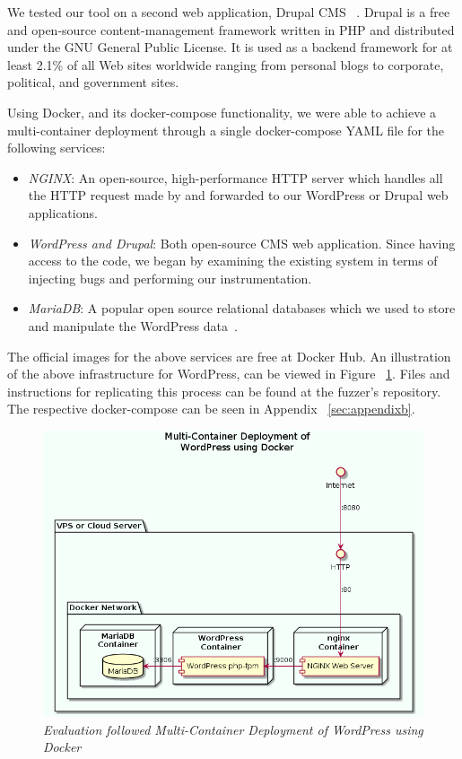 We tested our tool on a second web application, Drupal CMS ~\cite{drupal}. Drupal is a free and open-source content-management framework written in PHP and distributed under the GNU General Public License. It is used as a backend framework for at least 2.1\% of all Web sites worldwide ranging from personal blogs to corporate, political, and government sites.

Using Docker, and its docker-compose functionality, we were able to achieve a multi-container deployment through a single docker-compose YAML file for the following services:

\begin{itemize}
	\item \emph{NGINX}: An open-source, high-performance HTTP server which handles all the HTTP request made by \pname{} and forwarded to our WordPress or Drupal web applications.{~\cite{nginx}}
	\item \emph{WordPress and Drupal}: Both open-source CMS web application. Since having access to the code, we began by examining the existing system in terms of injecting bugs and performing our instrumentation.
	\item \emph{MariaDB}: A popular open source relational databases which we used to store and manipulate the WordPress data~\cite{mariadb}.
\end{itemize}

The official images for the above services are free at Docker Hub. An illustration of the above infrastructure for WordPress, can be viewed in Figure ~\ref{fig:multi-container}. Files and instructions for replicating this process can be found at the fuzzer's repository. The respective docker-compose can be seen in Appendix ~\ref{sec:appendixb}.

\begin{figure}[ht]
 \centering
 \captionsetup{justification=centering}
 \includegraphics[width=\linewidth]{figures/multi-container.png}
 \caption[Multi-Container Deployment of WordPress using Docker]{\textit{Evaluation followed Multi-Container Deployment of WordPress using Docker} ~\cite{multi-container}}
 \label{fig:multi-container}
\end{figure}

